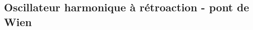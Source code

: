 \documentclass[canadien,12pt,oneside,letterpaper]{article}
\begin{document}





\subsection{Oscillateur harmonique à rétroaction - pont de Wien}

\end{document}
